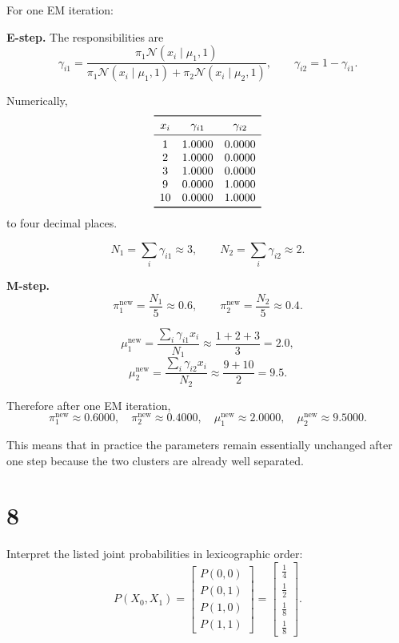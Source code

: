 \documentclass[11pt]{article}
\begin{document}
For one EM iteration:

\textbf{E-step.} The responsibilities are
\[
\gamma_{i1}
=
\frac{\pi_1 \mathcal{N}(x_i\mid \mu_1,1)}
{\pi_1 \mathcal{N}(x_i\mid \mu_1,1)+\pi_2 \mathcal{N}(x_i\mid \mu_2,1)},
\qquad
\gamma_{i2}=1-\gamma_{i1}.
\]

Numerically,
\[
\begin{array}{c c c}
\toprule
x_i & \gamma_{i1} & \gamma_{i2}\\
\midrule
1  & 1.0000 & 0.0000\\
2  & 1.0000 & 0.0000\\
3  & 1.0000 & 0.0000\\
9  & 0.0000 & 1.0000\\
10 & 0.0000 & 1.0000\\
\bottomrule
\end{array}
\]
to four decimal places.

\[
N_1=\sum_i\gamma_{i1}\approx 3,\qquad N_2=\sum_i\gamma_{i2}\approx 2.
\]

\textbf{M-step.}
\[
\pi_1^{\text{new}}=\frac{N_1}{5}\approx 0.6,\qquad
\pi_2^{\text{new}}=\frac{N_2}{5}\approx 0.4.
\]

\[
\mu_1^{\text{new}}=\frac{\sum_i\gamma_{i1}x_i}{N_1}\approx \frac{1+2+3}{3}=2.0,
\]
\[
\mu_2^{\text{new}}=\frac{\sum_i\gamma_{i2}x_i}{N_2}\approx \frac{9+10}{2}=9.5.
\]

Therefore after one EM iteration,
\[
\boxed{
\pi_1^{\text{new}}\approx 0.6000,\quad
\pi_2^{\text{new}}\approx 0.4000,\quad
\mu_1^{\text{new}}\approx 2.0000,\quad
\mu_2^{\text{new}}\approx 9.5000.}
\]

This means that in practice the parameters remain essentially unchanged after one step because the two
clusters are already well separated.

\section*{8}

Interpret the listed joint probabilities in lexicographic order:
\[
P(X_0,X_1)=
\begin{bmatrix}
P(0,0)\\
P(0,1)\\
P(1,0)\\
P(1,1)
\end{bmatrix}
=
\begin{bmatrix}
\tfrac14\\
\tfrac12\\
\tfrac18\\
\tfrac18
\end{bmatrix}.
\]
\end{document}
